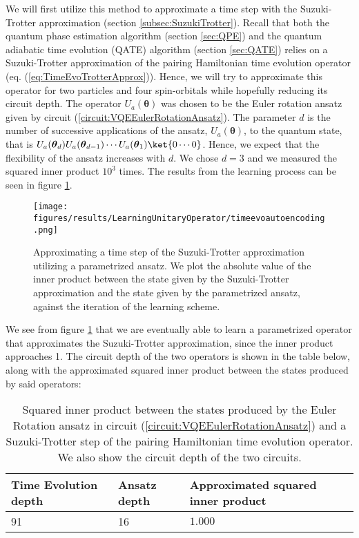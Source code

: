 We will first utilize this method to approximate a time step with the Suzuki-Trotter approximation (section \ref{subsec:SuzukiTrotter}). Recall that both the quantum phase estimation algorithm (section \ref{sec:QPE}) and the quantum adiabatic time evolution (QATE) algorithm (section \ref{sec:QATE}) relies on a Suzuki-Trotter approximation of the pairing Hamiltonian time evolution operator (eq.  (\ref{eq:TimeEvoTrotterApprox})). Hence, we will try to approximate this operator for two particles and four spin-orbitals while hopefully reducing its circuit depth. The operator $U_a(\boldsymbol{\theta})$ was chosen to be the Euler rotation ansatz given by circuit (\ref{circuit:VQEEulerRotationAnsatz}). The parameter $d$ is the number of successive applications of the ansatz, $U_a(\boldsymbol{\theta})$, to the quantum state, that is $U_a(\boldsymbol{\theta}_d)U_a(\boldsymbol{\theta}_{d-1})\cdots U_a(\boldsymbol{\theta}_1) \ket{0\cdots 0}$. Hence, we expect that the flexibility of the ansatz increases with $d$. We chose $d=3$ and we measured the squared inner product $10
^3$ times. The results from the learning process can be seen in figure \ref{fig:ResLearningTimeEvoOp}.
\begin{figure}[H]
    \centering
    \texttt{[image: figures/results/LearningUnitaryOperator/timeevoautoencoding.png]}
    \caption{Approximating a time step of the Suzuki-Trotter approximation utilizing a parametrized ansatz. We plot the absolute value of the inner product between the state given by the Suzuki-Trotter approximation and the state given by the parametrized ansatz, against the iteration of the learning scheme.}
    \label{fig:ResLearningTimeEvoOp}
\end{figure}
We see from figure \ref{fig:ResLearningTimeEvoOp} that we are eventually able to learn a parametrized operator that approximates the Suzuki-Trotter approximation, since the inner product approaches 1. The circuit depth of the two operators is shown in the table below, along with the approximated squared inner product between the states produced by said operators:
\begin{table}[H]
\centering
\caption{Squared inner product between the states produced by the Euler Rotation ansatz in circuit (\ref{circuit:VQEEulerRotationAnsatz}) and a Suzuki-Trotter step of the pairing Hamiltonian time evolution operator. We also show the circuit depth of the two circuits.}
\label{tab:LearnTimeEvoDepth}
\begin{tabular}{|l|l|l|}
\hline
Time Evolution depth & Ansatz depth & Approximated squared inner product \\ \hline
91                   & 16           & $1.000$     \\ \hline      
\end{tabular}
\end{table}

